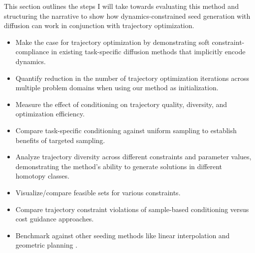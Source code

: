 This section outlines the steps I will take towards evaluating this method and structuring the narrative to show how dynamics-constrained seed generation with diffusion can work in conjunction with trajectory optimization.

\begin{itemize}
    \item Make the case for trajectory optimization by demonstrating soft constraint-compliance in existing task-specific diffusion methods that implicitly encode dynamics.
    \item Quantify reduction in the number of trajectory optimization iterations across multiple problem domains when using our method as initialization.
    \item Measure the effect of conditioning on trajectory quality, diversity, and optimization efficiency.
    \item Compare task-specific conditioning against uniform sampling to establish benefits of targeted sampling.
    \item Analyze trajectory diversity across different constraints and parameter values, demonstrating the method's ability to generate solutions in different homotopy classes.
    \item Visualize/compare feasible sets for various constraints.
    \item Compare trajectory constraint violations of sample-based conditioning versus cost guidance approaches.
    \item Benchmark against other seeding methods like linear interpolation and geometric planning \cite{thomason2024motions}.
\end{itemize}

